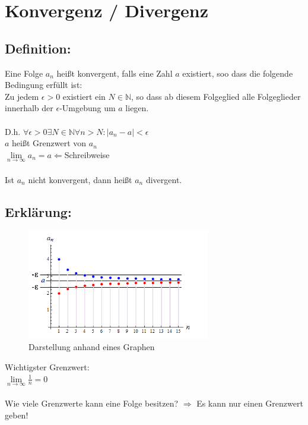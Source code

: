 \documentclass[../mainfile.tex]{article}
\begin{document}
	\section{Konvergenz / Divergenz}
	\subsection*{Definition:}
	Eine Folge $a_{n}$ heißt konvergent, falls eine Zahl $a$ existiert, soo dass die folgende Bedingung erfüllt ist:\\
	Zu jedem $\epsilon > 0$ existiert ein $N \in \mathbb{N}$, so dass ab diesem Folgeglied alle Folgeglieder innerhalb der $\epsilon$-Umgebung um $a$ liegen.\\
	\\
	D.h. $\forall \epsilon > 0 \exists N \in \mathbb{N} \forall n > N: |a_{n}-a| < \epsilon$\\
	$a$ heißt Grenzwert von $a_{n}$\\
	
	$\lim\limits_{n \rightarrow \infty}{a_{n}} = a \Leftarrow $Schreibweise\\
	\\
	Ist $a_{n}$ nicht konvergent, dann heißt $a_{n}$ divergent.
	\subsection*{Erklärung:}
	\begin{figure}[h] 
		\centering
		\includegraphics[width=8cm]{./swahl/img/konvergenzGraph.jpg}
		\caption{Darstellung anhand eines Graphen}
	\end{figure}
	Wichtigster Grenzwert:\\
	
	$\lim\limits_{n \rightarrow \infty}{\frac{1}{n}} = 0$\\
	\\
	Wie viele Grenzwerte kann eine Folge besitzen? $\Rightarrow$ Es kann nur einen Grenzwert geben! 
\end{document}
